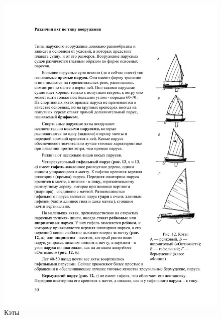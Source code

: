\documentclass[a4paper, 12pt, twoside, final]{scrbook}
\begin{document}
\begin{figure}[htbp]
	\begin{minipage}[b]{0.49\textwidth}
		\centering\includegraphics{pics/Kety}
		\caption{Кэты}
		\label{fig:12}
	\end{minipage}
	\hfil\hfil%
	\begin{minipage}[b]{0.49\textwidth}

\end{minipage}
\end{figure}
\end{document}
